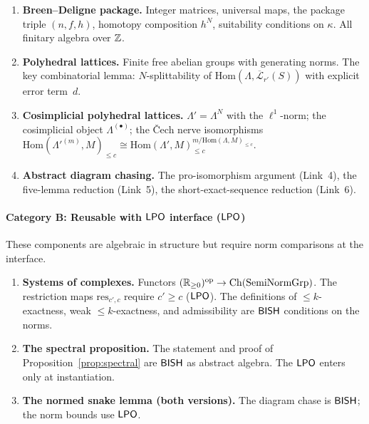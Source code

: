 \begin{enumerate}[nosep]
\item \textbf{Breen--Deligne package.}  Integer matrices, universal
  maps, the package triple $(n, f, h)$, homotopy composition
  $h^N$, suitability conditions on $\kappa$.  All finitary
  algebra over $\mathbb{Z}$.

\item \textbf{Polyhedral lattices.}  Finite free abelian groups with
  generating norms.  The key combinatorial lemma:
  $N$-splittability of $\mathrm{Hom}(\Lambda,
  \overline{\mathcal{L}}_{r'}(S))$ with explicit error term~$d$.

\item \textbf{Cosimplicial polyhedral lattices.}
  $\Lambda' = \Lambda^N$ with the $\ell^1$-norm; the cosimplicial
  object $\Lambda^{(\bullet)}$; the Čech nerve isomorphisms
  $\mathrm{Hom}(\Lambda'^{(m)}, M)_{\leq c} \cong
  \mathrm{Hom}(\Lambda', M)_{\leq c}^{m /
  \mathrm{Hom}(\Lambda, M)_{\leq c}}$.

\item \textbf{Abstract diagram chasing.}  The pro-isomorphism
  argument (Link~4), the five-lemma reduction (Link~5), the
  short-exact-sequence reduction (Link~6).
\end{enumerate}

\paragraph{Category B: Reusable with $\textsf{LPO}$ interface ($\textsf{LPO}$)}

These components are algebraic in structure but require norm
comparisons at the interface.

\begin{enumerate}[nosep]
\item \textbf{Systems of complexes.}  Functors
  $(\mathbb{R}_{\geq 0})^{\mathrm{op}} \to \mathrm{Ch}(\mathrm{SemiNormGrp})$.
  The restriction maps $\mathrm{res}_{c',c}$ require
  $c' \geq c$ ($\textsf{LPO}$).  The definitions of $\leq k$-exactness,
  weak $\leq k$-exactness, and admissibility are $\textsf{BISH}$
  conditions on the norms.

\item \textbf{The spectral proposition.}
  The statement and proof of Proposition~\ref{prop:spectral}
  are $\textsf{BISH}$ as abstract algebra.  The $\textsf{LPO}$ enters only at
  instantiation.

\item \textbf{The normed snake lemma (both versions).}
  The diagram chase is $\textsf{BISH}$; the norm bounds use
  $\textsf{LPO}$.
\end{enumerate}


